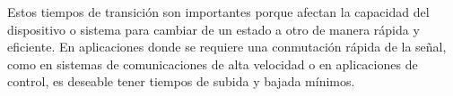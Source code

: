 \documentclass[12pt,fleqn,a4paper,oneside]{LegrandOrangeBook}
\begin{document}
\begin{remark}
Estos tiempos de transición son importantes porque afectan la capacidad del dispositivo o sistema para cambiar de un estado a otro de manera rápida y eficiente. En aplicaciones donde se requiere una conmutación rápida de la señal, como en sistemas de comunicaciones de alta velocidad o en aplicaciones de control, es deseable tener tiempos de subida y bajada mínimos.
\end{remark}

\end{document}
